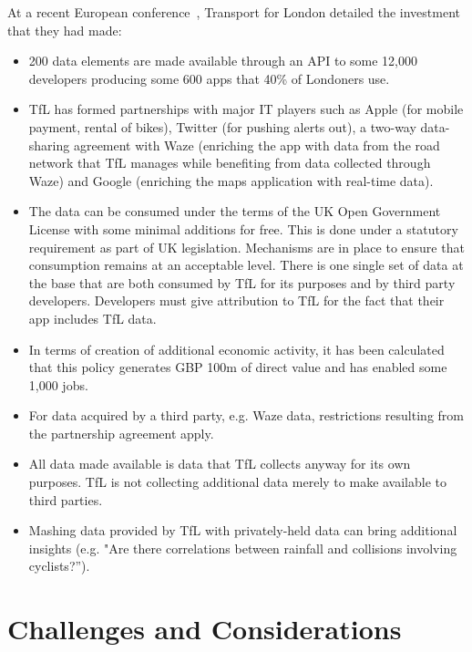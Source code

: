 At a recent European conference~\citep{api_industrial_data}, Transport for London detailed the investment
that they had made:
\begin{itemize}
	\item 200 data elements are made available through an API to some 12,000
	developers producing some 600 apps that 40\% of Londoners use.
	
	\item TfL has formed partnerships with major IT players such as Apple
	(for mobile payment, rental of bikes), Twitter (for pushing alerts out),
	a two-way data-sharing agreement with Waze (enriching the app with data
	from the road network that TfL manages while benefiting from data collected
	through Waze) and Google (enriching the maps application with real-time data).
	
	\item The data can be consumed under the terms of the UK Open Government
	License with some minimal additions for free. This is done under a statutory
	requirement as part of UK legislation. Mechanisms are in place to ensure that
	consumption remains at an acceptable level. There is one single set of data
	at the base that are both consumed by TfL for its purposes and by third	party
	developers. Developers must give attribution to TfL for the fact that their
	app includes TfL data.
	
	\item In terms of creation of additional economic activity, it has been
	calculated that this policy	generates GBP 100m of direct value and has enabled
	some 1,000 jobs.
	
	\item For data acquired by a third party, e.g. Waze data, restrictions resulting
	from the partnership agreement apply.
	
	\item All data made available is data that TfL collects anyway for its own
	purposes. TfL is not collecting additional data merely to make available to
	third parties.
	
	\item Mashing data provided by TfL with privately-held data can bring additional
	insights (e.g. "Are	there correlations between rainfall and collisions involving cyclists?”).
\end{itemize}

\section{Challenges and Considerations}

